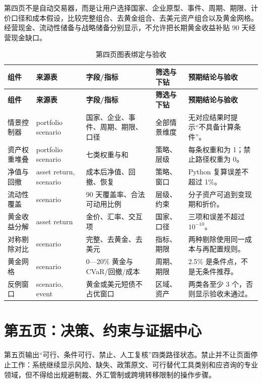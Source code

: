 \documentclass[UTF8,fontset=windows,12pt,openany]{ctexbook}
\begin{document}
第四页不是自动交易器，而是让用户选择国家、企业原型、事件、周期、期限、计价口径和成本假设，比较完整组合、去黄金组合、去美元资产组合以及黄金网格。经营现金、流动性储备与战略储备分别显示，不允许把长期黄金收益补贴 90 天经营现金缺口。

\clearpage
\begin{landscape}
\begin{longtable}{p{3.3cm}p{3.6cm}p{4.5cm}p{3.0cm}p{4.5cm}}
\caption{第四页图表绑定与验收}\label{tab:page4-map}\\
\toprule
\textbf{组件} & \textbf{来源表} & \textbf{字段/指标} & \textbf{筛选与下钻} & \textbf{预期结论与验收}\\
\midrule
\endfirsthead
\toprule \textbf{组件} & \textbf{来源表} & \textbf{字段/指标} & \textbf{筛选与下钻} & \textbf{预期结论与验收}\\ \midrule
\endhead
情景控制器 & portfolio scenario & 国家、企业、事件、周期、期限、口径 & 全部情景维度 & 无对应结果时提示“不具备计算条件”。\\
资产权重堆叠 & portfolio scenario & 七类权重与和 & 策略、层级 & 每条权重和为 1；禁止路径权重为 0。\\
净值与回撤 & asset return, scenario & 成本后净值、回撤、恢复 & 策略、窗口 & Python 复算误差不超过 1\%。\\
流动性覆盖 & scenario & 90 天覆盖率、合法可动用比例 & 层级、约束 & 分子资产可追到变现期和折价。\\
黄金收益分解 & asset return & 金价、汇率、交互项 & 国家、口径 & 三项和误差不超过 \(10^{-10}\)。\\
对称剔除对比 & scenario & 完整、去黄金、去美元 & 指标、期限 & 两种剔除使用同一成本与再配置规则。\\
黄金网格 & scenario & 0—20\% 黄金与 CVaR/回撤/成本 & 周期、期限 & 2.5\% 是条件点，不是无条件推荐。\\
反例窗口 & scenario, event & 黄金或美元短债不占优窗口 & 区域、资产 & 两类各至少 3 个，否则显示验收未通过。\\
\bottomrule
\end{longtable}
\end{landscape}

\chapter{第五页：决策、约束与证据中心}

第五页输出“可行、条件可行、禁止、人工复核”四类路径状态。禁止并不让页面停止工作：系统继续显示风险、缺失、政策原文、可行替代工具类别和应咨询的专业领域，但不得给出规避制裁、外汇管制或跨境转移限制的操作步骤。
\end{document}
